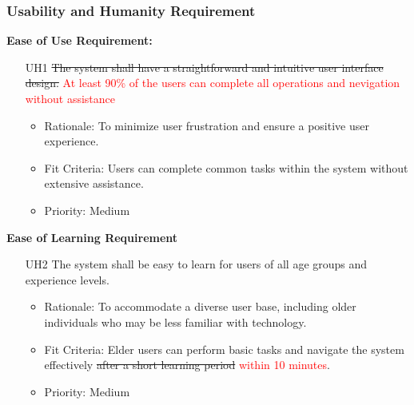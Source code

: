 \documentclass[12pt]{article}
\begin{document}
\subsubsection{Usability and Humanity Requirement}
\textbf{Ease of Use Requirement:}
\begin{itemize}
    \item[UH1] \sout{The system shall have a straightforward and intuitive user interface design.}
    \textcolor{red}{At least 90\% of the users can complete all operations and nevigation without assistance} \label{UH1}
    \begin{itemize}
        \item Rationale: To minimize user frustration and ensure a positive user experience.
        \item Fit Criteria: Users can complete common tasks within the system without extensive assistance.
        \item Priority: Medium
    \end{itemize}
\end{itemize}
\textbf{Ease of Learning Requirement}
\begin{itemize}
    \item[UH2] The system shall be easy to learn for users of all age groups and experience levels. \label{UH2}
    \begin{itemize}
        \item Rationale: To accommodate a diverse user base, including older individuals who may be less familiar with technology.
        \item Fit Criteria: Elder users can perform basic tasks and navigate the system effectively \sout{after a short learning period}
        \textcolor{red}{within 10 minutes}.
        \item Priority: Medium
    \end{itemize}
\end{itemize}
\end{document}
